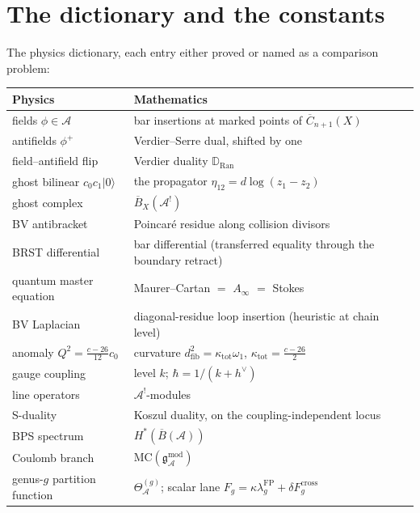 \documentclass[11pt]{article}
\providecommand{\cA}{\mathcal{A}}
\providecommand{\fg}{\mathfrak{g}}
\providecommand{\barB}{\overline{B}}
\providecommand{\MC}{\mathrm{MC}}
\providecommand{\Ran}{\operatorname{Ran}}
\begin{document}
\section{The dictionary and the constants}\label{sec:dictionary}

The physics dictionary, each entry either proved or named as a
comparison problem:

\begin{center}
\renewcommand{\arraystretch}{1.25}
\begin{tabular}{ll}
\textbf{Physics} & \textbf{Mathematics}\\
\hline
fields $\phi\in\cA$ & bar insertions at marked points of
$\overline C_{n+1}(X)$\\
antifields $\phi^+$ & Verdier--Serre dual, shifted by one\\
field--antifield flip & Verdier duality $\mathbb D_{\Ran}$\\
ghost bilinear $c_0c_1|0\rangle$ & the propagator
$\eta_{12}=d\log(z_1-z_2)$\\
ghost complex & $\barB_X(\cA^!)$\\
BV antibracket & Poincar\'e residue along collision divisors\\
BRST differential & bar differential \textup{(transferred equality
through the boundary retract)}\\
quantum master equation & Maurer--Cartan $=$ $A_\infty$ $=$ Stokes\\
BV Laplacian & diagonal-residue loop insertion
\textup{(heuristic at chain level)}\\
anomaly $Q^2=\frac{c-26}{12}c_0$ & curvature
$d^2_{\mathrm{fib}}=\kappa_{\mathrm{tot}}\omega_1$,
$\kappa_{\mathrm{tot}}=\frac{c-26}{2}$\\
gauge coupling & level $k$; \quad $\hbar=1/(k+h^\vee)$\\
line operators & $\cA^!$-modules\\
S-duality & Koszul duality, on the coupling-independent locus\\
BPS spectrum & $H^*(\barB(\cA))$\\
Coulomb branch & $\MC(\fg^{\mathrm{mod}}_\cA)$\\
genus-$g$ partition function & $\Theta^{(g)}_\cA$; scalar lane
$F_g=\kappa\lambda^{\mathrm{FP}}_g+\delta F^{\mathrm{cross}}_g$\\
\end{tabular}
\end{center}
\end{document}
